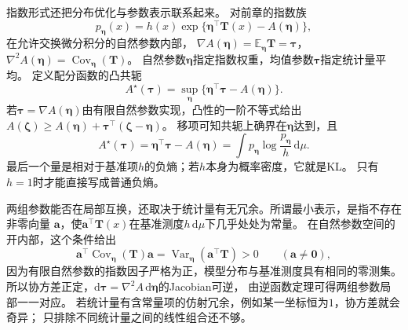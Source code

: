 指数形式还把分布优化与参数表示联系起来。
对前章的指数族
\[
  p_{\bm\eta}(x)
  =h(x)\exp\{\bm\eta^\top\bm T(x)-A(\bm\eta)\},
\]
在允许交换微分积分的自然参数内部，
\(\nabla A(\bm\eta)=\mathbb E_{\bm\eta}\bm T=\bm\tau\)，
\(\nabla^2A(\bm\eta)=\operatorname{Cov}_{\bm\eta}(\bm T)\)。
自然参数\(\bm\eta\)指定指数权重，均值参数\(\bm\tau\)指定统计量平均。
定义配分函数的凸共轭
\begin{equation}
  A^\star(\bm\tau)
  =\sup_{\bm\eta}\{\bm\eta^\top\bm\tau-A(\bm\eta)\}.
  \label{eq:information-log-partition-conjugate}
\end{equation}
若\(\bm\tau=\nabla A(\bm\eta)\)由有限自然参数实现，凸性的一阶不等式给出
\(A(\bm\zeta)\geq A(\bm\eta)+\bm\tau^\top(\bm\zeta-\bm\eta)\)。
移项可知共轭上确界在\(\bm\eta\)达到，且
\[
  A^\star(\bm\tau)=\bm\eta^\top\bm\tau-A(\bm\eta)
  =\int p_{\bm\eta}\log\frac{p_{\bm\eta}}h\,\mathrm d\mu.
\]
最后一个量是相对于基准项\(h\)的负熵；若\(h\)本身为概率密度，它就是KL。
只有\(h=1\)时才能直接写成普通负熵。

两组参数能否在局部互换，还取决于统计量有无冗余。所谓最小表示，是指不存在非零向量
\(\bm a\)，使\(\bm a^\top\bm T(x)\)在基准测度\(h\,\mathrm d\mu\)下几乎处处为常量。
在自然参数空间的开内部，这个条件给出
\[
 \bm a^\top\operatorname{Cov}_{\bm\eta}(\bm T)\bm a
 =\operatorname{Var}_{\bm\eta}(\bm a^\top\bm T)>0
 \qquad(\bm a\neq\bm0),
\]
因为有限自然参数的指数因子严格为正，模型分布与基准测度具有相同的零测集。
所以协方差正定，\(\mathrm d\bm\tau=\nabla^2A\,\mathrm d\bm\eta\)的Jacobian可逆，
由逆函数定理可得两组参数局部一一对应。
若统计量有含常量项的仿射冗余，例如某一坐标恒为\(1\)，协方差就会奇异；
只排除不同统计量之间的线性组合还不够。

